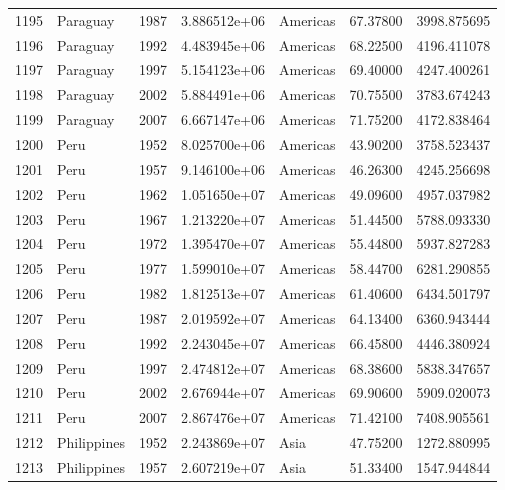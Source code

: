 \documentclass[
  letterpaper,
  DIV=11,
  numbers=noendperiod]{scrreprt}
\begin{document}
\begin{tabular}{llrrlrr}
1195 &                  Paraguay &  1987 &  3.886512e+06 &  Americas &  67.37800 &    3998.875695 \\
1196 &                  Paraguay &  1992 &  4.483945e+06 &  Americas &  68.22500 &    4196.411078 \\
1197 &                  Paraguay &  1997 &  5.154123e+06 &  Americas &  69.40000 &    4247.400261 \\
1198 &                  Paraguay &  2002 &  5.884491e+06 &  Americas &  70.75500 &    3783.674243 \\
1199 &                  Paraguay &  2007 &  6.667147e+06 &  Americas &  71.75200 &    4172.838464 \\
1200 &                      Peru &  1952 &  8.025700e+06 &  Americas &  43.90200 &    3758.523437 \\
1201 &                      Peru &  1957 &  9.146100e+06 &  Americas &  46.26300 &    4245.256698 \\
1202 &                      Peru &  1962 &  1.051650e+07 &  Americas &  49.09600 &    4957.037982 \\
1203 &                      Peru &  1967 &  1.213220e+07 &  Americas &  51.44500 &    5788.093330 \\
1204 &                      Peru &  1972 &  1.395470e+07 &  Americas &  55.44800 &    5937.827283 \\
1205 &                      Peru &  1977 &  1.599010e+07 &  Americas &  58.44700 &    6281.290855 \\
1206 &                      Peru &  1982 &  1.812513e+07 &  Americas &  61.40600 &    6434.501797 \\
1207 &                      Peru &  1987 &  2.019592e+07 &  Americas &  64.13400 &    6360.943444 \\
1208 &                      Peru &  1992 &  2.243045e+07 &  Americas &  66.45800 &    4446.380924 \\
1209 &                      Peru &  1997 &  2.474812e+07 &  Americas &  68.38600 &    5838.347657 \\
1210 &                      Peru &  2002 &  2.676944e+07 &  Americas &  69.90600 &    5909.020073 \\
1211 &                      Peru &  2007 &  2.867476e+07 &  Americas &  71.42100 &    7408.905561 \\
1212 &               Philippines &  1952 &  2.243869e+07 &      Asia &  47.75200 &    1272.880995 \\
1213 &               Philippines &  1957 &  2.607219e+07 &      Asia &  51.33400 &    1547.944844 \\

\end{tabular}
\end{document}
